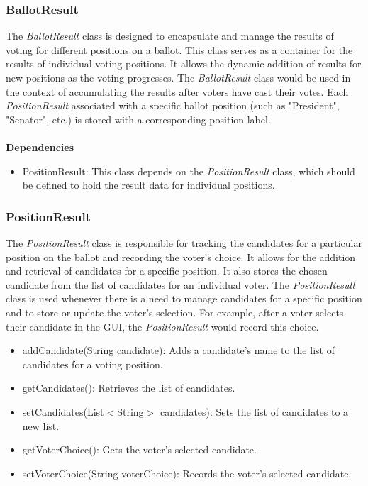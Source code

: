 \documentclass{article}
\begin{document}
\subsubsection{BallotResult}
The \textit{BallotResult} class is designed to encapsulate and manage the results of voting for different positions on a ballot. This class serves as a container for the results of individual voting positions. It allows the dynamic addition of results for new positions as the voting progresses. The \textit{BallotResult} class would be used in the context of accumulating the results after voters have cast their votes. Each \textit{PositionResult} associated with a specific ballot position (such as "President", "Senator", etc.) is stored with a corresponding position label. \\ \\
\textbf{Dependencies}

\begin{itemize}
    \item PositionResult: This class depends on the \textit{PositionResult} class, which should be defined to hold the result data for individual positions.
\end{itemize}

\subsubsection{PositionResult}
The \textit{PositionResult} class is responsible for tracking the candidates for a particular position on the ballot and recording the voter's choice. It allows for the addition and retrieval of candidates for a specific position. It also stores the chosen candidate from the list of candidates for an individual voter. The \textit{PositionResult} class is used whenever there is a need to manage candidates for a specific position and to store or update the voter's selection. For example, after a voter selects their candidate in the GUI, the \textit{PositionResult} would record this choice.

\begin{itemize}
    \item addCandidate(String candidate): Adds a candidate's name to the list of candidates for a voting position.
    \item getCandidates(): Retrieves the list of candidates.
    \item setCandidates(List$<$String$>$ candidates): Sets the list of candidates to a new list.
    \item getVoterChoice(): Gets the voter's selected candidate.
    \item setVoterChoice(String voterChoice): Records the voter's selected candidate.
\end{itemize}
\end{document}
